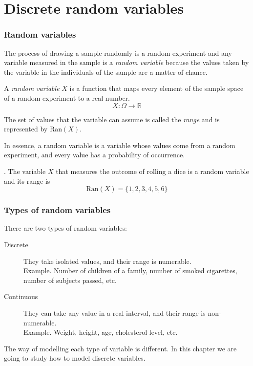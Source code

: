 \section{Discrete random variables}



\begin{frame}
\frametitle{Random variables}
The process of drawing a sample randomly is a random experiment and any variable measured in the sample is a
\emph{random variable} because the values taken by the variable in the individuals of the sample are a matter of chance.

\begin{definition} 
A \emph{random variable} $X$ is a function that maps every element of the sample space of a random experiment to a real
number.
\[ 
X:\Omega \rightarrow \mathbb{R} 
\]

The set of values that the variable can assume is called the \emph{range} and is represented by $\mbox{Ran}(X)$.
\end{definition}

In essence, a random variable is a variable whose values come from a random experiment, and every value has
a probability of occurrence. 

. The variable $X$ that measures the outcome of rolling a dice is a random variable and its
range is 
\[
\mbox{Ran}(X)=\{1,2,3,4,5,6\}
\]
\end{frame}


\begin{frame}
\frametitle{Types of random variables}
There are two types of random variables:
\begin{description}
\item[Discrete] They take isolated values, and their range is numerable.\\
Example. Number of children of a family, number of smoked cigarettes, number of subjects passed, etc.
\item[Continuous] They can take any value in a real interval, and their range is non-numerable.\\
Example. Weight, height, age, cholesterol level, etc. 
\end{description}

The way of modelling each type of variable is different. 
In this chapter we are going to study how to model discrete variables.
\end{frame}


